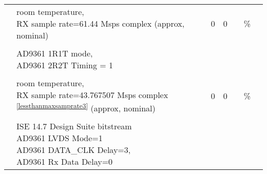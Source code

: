 \documentclass{article}
\begin{document}
\begin{scriptsize}
\begin{longtable}{|c|l|c|c|c|c|l|}
                          & \multirow{2}{*}{\parbox{9.5cm}{\hspace*{15mm}room temperature, \\ \hspace*{15mm}RX sample rate=61.44 Msps complex (approx, nominal)}} & \multirow{2}{*}{0} & \multirow{2}{*}{0} & & \multirow{2}{*}{\%} & \\
                          &                                      &                                & &                                &                      & \\
                          &                                      &                                & &                                &                      & \\
                          & \multirow{2}{*}{\parbox{9.5 cm}{\hspace*{12mm}AD9361 1R1T mode, \\ \hspace*{12mm}AD9361 2R2T Timing = 1}} & & & & & \\
                          &                                      &                                & &                                &                      & \\
                          &                                      &                                & &                                &                      & \\
                          & \multirow{2}{*}{\parbox{9.5cm}{\hspace*{15mm}room temperature, \\ \hspace*{15mm}RX sample rate=43.767507 Msps complex \textsuperscript{\ref{lessthanmaxsamprate3}} (approx, nominal)}} & \multirow{2}{*}{0} & \multirow{2}{*}{0} & & \multirow{2}{*}{\%} & \multirow{2}{*}{} \\
                          &                                      &                                & &                                &                      & \\
                          &                                      &                                & &                                &                      & \\
                          & \parbox{9.5 cm}{\hspace*{3mm}ISE 14.7 Design Suite bitstream \\\hspace*{6mm}AD9361 LVDS Mode=1 \\\hspace*{9mm}AD9361 DATA\_CLK Delay=3, \\\hspace*{9mm}AD9361 Rx Data Delay=0} & & & & & \\

\end{longtable}
\end{scriptsize}
\end{document}
